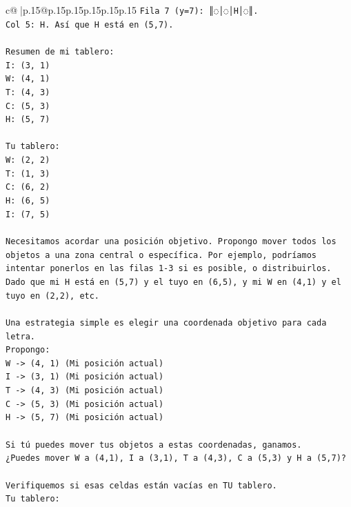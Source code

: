 \documentclass{article}
\begin{document}
{\begin{supertabular}{c@{$\;$}|p{.15\linewidth}@{}p{.15\linewidth}p{.15\linewidth}p{.15\linewidth}p{.15\linewidth}p{.15\linewidth}}
{{{\texttt{Fila 7 (y=7): ║◌│◌│H│◌║.} \\
\texttt{Col 5: H. Así que H está en (5,7).} \\
\\ 
\texttt{Resumen de mi tablero:} \\
\texttt{I: (3, 1)} \\
\texttt{W: (4, 1)} \\
\texttt{T: (4, 3)} \\
\texttt{C: (5, 3)} \\
\texttt{H: (5, 7)} \\
\\ 
\texttt{Tu tablero:} \\
\texttt{W: (2, 2)} \\
\texttt{T: (1, 3)} \\
\texttt{C: (6, 2)} \\
\texttt{H: (6, 5)} \\
\texttt{I: (7, 5)} \\
\\ 
\texttt{Necesitamos acordar una posición objetivo. Propongo mover todos los objetos a una zona central o específica. Por ejemplo, podríamos intentar ponerlos en las filas 1{-}3 si es posible, o distribuirlos.} \\
\texttt{Dado que mi H está en (5,7) y el tuyo en (6,5), y mi W en (4,1) y el tuyo en (2,2), etc.} \\
\\ 
\texttt{Una estrategia simple es elegir una coordenada objetivo para cada letra.} \\
\texttt{Propongo:} \\
\texttt{W {-}> (4, 1) (Mi posición actual)} \\
\texttt{I {-}> (3, 1) (Mi posición actual)} \\
\texttt{T {-}> (4, 3) (Mi posición actual)} \\
\texttt{C {-}> (5, 3) (Mi posición actual)} \\
\texttt{H {-}> (5, 7) (Mi posición actual)} \\
\\ 
\texttt{Si tú puedes mover tus objetos a estas coordenadas, ganamos.} \\
\texttt{¿Puedes mover W a (4,1), I a (3,1), T a (4,3), C a (5,3) y H a (5,7)?} \\
\\ 
\texttt{Verifiquemos si esas celdas están vacías en TU tablero.} \\
\texttt{Tu tablero:} \\
}}}
\end{supertabular}}
\end{document}
